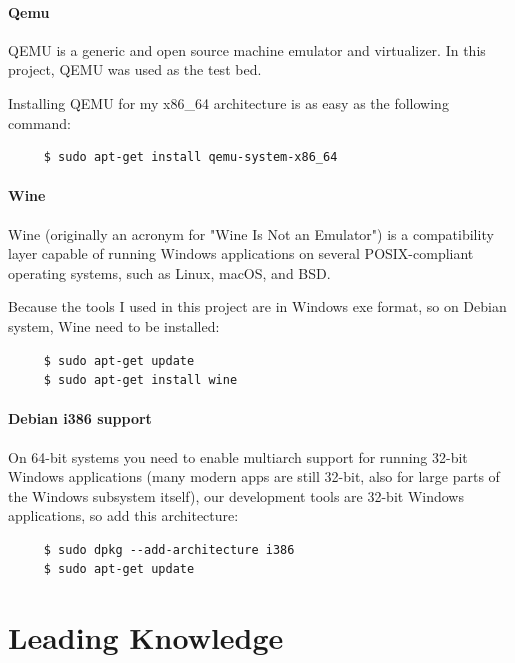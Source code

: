 \documentclass{swfcthesis}
\begin{document}

\subsubsection{Qemu}
\label{sec:qemu}

QEMU is a generic and open source machine emulator and virtualizer.
In this project, QEMU was used as the test bed.

Installing QEMU for my x86\_64 architecture is as easy as the following command: 
\begin{verbatim}
     $ sudo apt-get install qemu-system-x86_64
\end{verbatim}

\subsubsection{Wine}
\label{sec:wine}

Wine (originally an acronym for "Wine Is Not an Emulator") is a compatibility layer
capable of running Windows applications on several POSIX-compliant operating systems, such
as Linux, macOS, and BSD.

Because the tools I used in this project are in Windows exe format, so on Debian system,
Wine need to be installed:
\begin{verbatim}
     $ sudo apt-get update
     $ sudo apt-get install wine
\end{verbatim}

\subsubsection{Debian i386 support}
\label{sec:debian-i386-support}

On 64-bit systems you need to enable multiarch support 
for running 32-bit Windows applications (many modern apps are
still 32-bit, also for large parts of the Windows subsystem itself), our development
tools are 32-bit Windows applications, so add this architecture:

\begin{verbatim}
     $ sudo dpkg --add-architecture i386
     $ sudo apt-get update
\end{verbatim}

\chapter{Leading Knowledge}
\label{cha:leading-knowledge}
\end{document}
